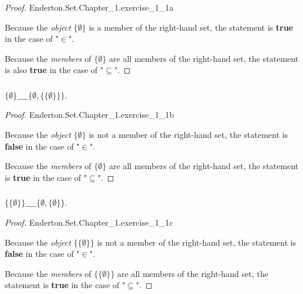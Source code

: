 \documentclass{report}
\begin{document}
\begin{proof}

    {Enderton.Set.Chapter\_1.exercise\_1\_1a}

  Because the \textit{object} $\{\emptyset\}$ is a member of the right-hand set,
    the statement is \textbf{true} in the case of "$\in$".

  Because the \textit{members} of $\{\emptyset\}$ are all members of the
    right-hand set, the statement is also \textbf{true} in the case of
    "$\subseteq$".

\end{proof}

\subsubsection{}%
\label{ssub:exercise-1.11b}

$\{\emptyset\} \_\_\_\_ \{\emptyset, \{\{\emptyset\}\}\}$.

\begin{proof}

    {Enderton.Set.Chapter\_1.exercise\_1\_1b}

  Because the \textit{object} $\{\emptyset\}$ is not a member of the right-hand
    set, the statement is \textbf{false} in the case of "$\in$".

  Because the \textit{members} of $\{\emptyset\}$ are all members of the
    right-hand set, the statement is \textbf{true} in the case of "$\subseteq$".

\end{proof}

\subsubsection{}%
\label{ssub:exercise-1.1c}

$\{\{\emptyset\}\} \_\_\_\_ \{\emptyset, \{\emptyset\}\}$.

\begin{proof}

    {Enderton.Set.Chapter\_1.exercise\_1\_1c}

  Because the \textit{object} $\{\{\emptyset\}\}$ is not a member of the
    right-hand set, the statement is \textbf{false} in the case of "$\in$".

  Because the \textit{members} of $\{\{\emptyset\}\}$ are all members of the
    right-hand set, the statement is \textbf{true} in the case of "$\subseteq$".

\end{proof}
\end{document}
